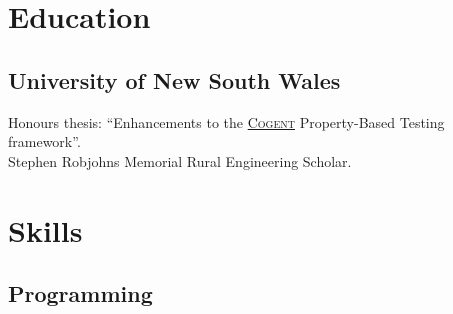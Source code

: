\documentclass[a4paper]{oscar-resume}
\begin{document}
\lastupdated{}

\begin{minipage}[t]{0.33\textwidth} %
    \section{Education}
    \smallsectionspace{}

    \subsection{University of New South Wales}
        Honours thesis: ``Enhancements to the \href{https://github.com/NICTA/cogent}{\textsc{Cogent}} Property-Based Testing framework''. \\
        Stephen Robjohns Memorial Rural Engineering Scholar.

    \section{Skills}
    \smallsectionspace{}

    \subsection{Programming}
    \smallsectionspace{}

        \rust{} \textbullet{} \clang{} \textbullet{} \cpp{} \\
        \python{} \textbullet{} \bash{} \\
        \typescript{} \textbullet{} \javascript{} \\
    \smallsectionspace{}


\end{minipage}
\end{document}
